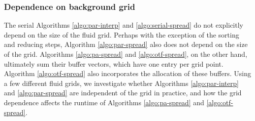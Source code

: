 \subsubsection{Dependence on background grid}

The serial Algorithms \ref{algo:par-interp} and \ref{algo:serial-spread}
do not explicitly depend on the size of the fluid grid. Perhaps with the
exception of the sorting and reducing steps, Algorithm \ref{algo:par-spread}
also does not depend on the size of the grid. Algorithms \ref{algo:pa-spread}
and \ref{algo:otf-spread}, on the other hand, ultimately sum their buffer
vectors, which have one entry per grid point. Algorithm \ref{algo:otf-spread}
also incorporates the allocation of these buffers. Using a few different fluid
grids, we investigate whether Algorithms \ref{algo:par-interp} and
\ref{algo:par-spread} are independent of the grid in practice, and how the grid
dependence affects the runtime of Algorithms \ref{algo:pa-spread} and
\ref{algo:otf-spread}.
%
%
